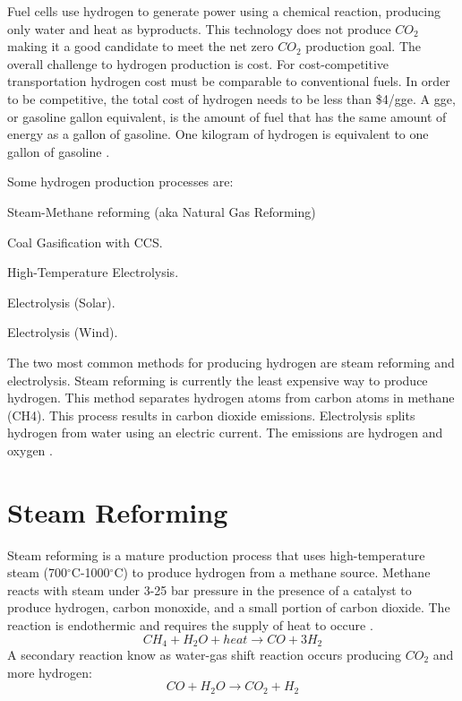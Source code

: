 Fuel cells use hydrogen to generate power using a chemical reaction, producing only water and heat as byproducts. This technology does not produce $CO_2$ making it a good candidate to meet the net zero $CO_2$ production goal. The overall challenge to hydrogen production is cost. For cost-competitive transportation hydrogen cost must be comparable to conventional fuels. In order to be competitive, the total  cost of hydrogen needs to be less than \$4/gge. A gge, or gasoline gallon equivalent, is the amount of fuel that has the same amount of energy as a gallon of gasoline. One kilogram of hydrogen is equivalent to one gallon of gasoline \cite{noauthor_hydrogen_nodate}.

Some hydrogen production processes are: 
\begin{description}[font=$\bullet$\scshape\bfseries]
	\item[] Steam-Methane reforming (aka Natural Gas Reforming)
	\item[] Coal Gasification with CCS.
	\item[] High-Temperature Electrolysis.
	\item[] Electrolysis (Solar).
	\item[] Electrolysis (Wind).
\end{description}

The two most common methods for producing hydrogen are steam reforming and electrolysis.
Steam reforming is currently the least expensive way to produce hydrogen. This method separates hydrogen atoms from carbon atoms in methane (CH4). This process results in carbon dioxide emissions.
Electrolysis splits hydrogen from water using an electric current. The emissions are hydrogen and oxygen \cite{noauthor_production_2019}. 

\section{Steam Reforming}

Steam reforming is a mature production process that uses high-temperature steam (700$^{\circ}$C-1000$^{\circ}$C) to produce hydrogen from a methane source. Methane reacts with steam under 3-25 bar pressure in the presence of a catalyst to produce hydrogen, carbon monoxide, and a small portion of carbon dioxide. The reaction is endothermic and requires the supply of heat to occure \cite{noauthor_hydrogen_nodate}.
\begin{equation}
CH_4 + H_2O + heat \rightarrow CO + 3H_2
\end{equation}
A secondary reaction know as water-gas shift reaction occurs producing $CO_2$ and more hydrogen:
\begin{equation}
CO + H_2O \rightarrow CO_2 + H_2
\end{equation}

